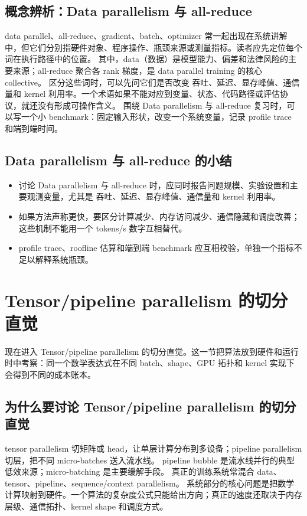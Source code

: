 \documentclass[a4paper]{article}
\begin{document}
\subsection{概念辨析：Data parallelism 与 all-reduce}
data parallel、all-reduce、gradient、batch、optimizer 常一起出现在系统讲解中，但它们分别指硬件对象、程序操作、瓶颈来源或测量指标。读者应先定位每个词在执行路径中的位置。
其中，data（数据）是模型能力、偏差和法律风险的主要来源；all-reduce 聚合各 rank 梯度，是 data parallel training 的核心 collective。
区分这些词时，可以先问它们是否改变 吞吐、延迟、显存峰值、通信量和 kernel 利用率。一个术语如果不能对应到变量、状态、代码路径或评估协议，就还没有形成可操作含义。
围绕 Data parallelism 与 all-reduce 复习时，可以写一个小 benchmark：固定输入形状，改变一个系统变量，记录 profile trace 和端到端时间。
\subsection{Data parallelism 与 all-reduce 的小结}
\begin{itemize}
\item 讨论 Data parallelism 与 all-reduce 时，应同时报告问题规模、实验设置和主要观测变量，尤其是 吞吐、延迟、显存峰值、通信量和 kernel 利用率。
\item 如果方法声称更快，要区分计算减少、内存访问减少、通信隐藏和调度改善；这些机制不能用一个 tokens/s 数字互相替代。
\item profile trace、roofline 估算和端到端 benchmark 应互相校验，单独一个指标不足以解释系统瓶颈。
\end{itemize}
\section{Tensor/pipeline parallelism 的切分直觉}
现在进入 Tensor/pipeline parallelism 的切分直觉。这一节把算法放到硬件和运行时中考察：同一个数学表达式在不同 batch、shape、GPU 拓扑和 kernel 实现下会得到不同的成本账本。
\subsection{为什么要讨论 Tensor/pipeline parallelism 的切分直觉}
tensor parallelism 切矩阵或 head，让单层计算分布到多设备；pipeline parallelism 切层，把不同 micro-batches 送入流水线。
pipeline bubble 是流水线并行的典型低效来源；micro-batching 是主要缓解手段。
真正的训练系统常混合 data、tensor、pipeline、sequence/context parallelism。
系统部分的核心问题是把数学计算映射到硬件。一个算法的复杂度公式只能给出方向；真正的速度还取决于内存层级、通信拓扑、kernel shape 和调度方式。
\end{document}
